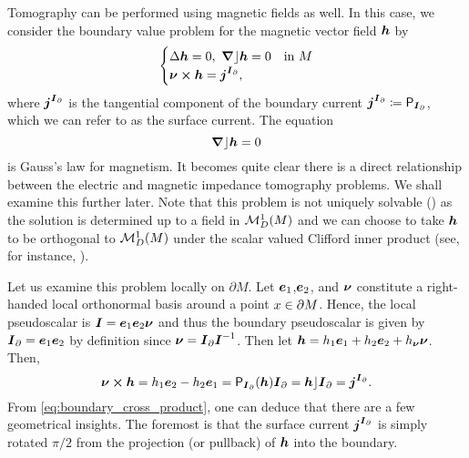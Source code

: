 Tomography can be performed using magnetic fields as well. In this case, we consider the boundary value problem for the magnetic vector field $\boldsymbol{h}$ by
\begin{equation}
\label{eq:magnetic_forward_problem}
\begin{cases}
\Delta \boldsymbol{h} = 0, ~\boldsymbol{\nabla} \rfloor \boldsymbol{h}=0 & \textrm{in $M$}\\
\boldsymbol{\nu}\boldsymbol{\times} \boldsymbol{h} = \boldsymbol{j}^{\boldsymbol{I}_\partial},
\end{cases}
\end{equation}
where $\boldsymbol{j}^{\boldsymbol{I}_\partial}$ is the tangential component of the boundary current $\boldsymbol{j}^{\boldsymbol{I}_\partial} \coloneqq \mathsf{P}_{\boldsymbol{I}_\partial}$, which we can refer to as the surface current. The equation
\begin{equation}
\label{eq:gauss_law}
\boldsymbol{\nabla} \rfloor \boldsymbol{h} = 0
\end{equation}
is Gauss's law for magnetism. It becomes quite clear there is a direct relationship between the electric and magnetic impedance tomography problems. We shall examine this further later. Note that this problem is not uniquely solvable (\cite[Theorem 3.5.6]{schwarz_hodge_1995}) as the solution is determined up to a field in $\mathcal{M}^{1}_D(M)$ and we can choose to take $\boldsymbol{h}$ to be orthogonal to $\mathcal{M}^{1}_D(M)$ under the scalar valued Clifford inner product (see, for instance, \cite{belishev_remarks_2005}). 

Let us examine this problem locally on $\partial M$. Let $\boldsymbol{e}_1$,$\boldsymbol{e}_2$, and $\boldsymbol{\nu}$ constitute a right-handed local orthonormal basis around a point $x\in {\partial M}$. Hence, the local pseudoscalar is $\boldsymbol{I} = \boldsymbol{e}_1\boldsymbol{e}_2\boldsymbol{\nu}$ and thus the boundary pseudoscalar is given by $\boldsymbol{I}_\partial = \boldsymbol{e}_1\boldsymbol{e}_2$ by definition since $\boldsymbol{\nu} = \boldsymbol{I}_\partial \boldsymbol{I}^{-1}$. Then let $\boldsymbol{h}=h_1\boldsymbol{e}_1 + h_2 \boldsymbol{e}_2 + h_{\boldsymbol{\nu}} \boldsymbol{\nu}$. Then,
\begin{equation}
\label{eq:boundary_cross_product}
\boldsymbol{\nu} \boldsymbol{\times} \boldsymbol{h} = h_1 \boldsymbol{e}_2 - h_2 \boldsymbol{e}_1 = \mathsf{P}_{\boldsymbol{I}_\partial} (\boldsymbol{h}) \boldsymbol{I}_\partial=  \boldsymbol{h}\rfloor \boldsymbol{I}_\partial = \boldsymbol{j}^{\boldsymbol{I}_\partial}.
\end{equation}
From \cref{eq:boundary_cross_product}, one can deduce that there are a few geometrical insights. The foremost is that the surface current $\boldsymbol{j}^{\boldsymbol{I}_\partial}$ is simply rotated $\pi/2$ from the projection (or pullback) of $\boldsymbol{h}$ into the boundary.

